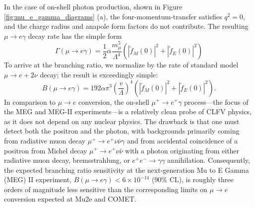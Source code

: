 \documentclass{book}[letterpaper,12pt]
\begin{document}
In the case of on-shell photon production, shown in Figure \ref{fig:mu_e_gamma_diagrams} (a), the four-momentum-transfer satisfies $q^2=0$, and the charge radius and anapole form factors do not contribute. The resulting $\mu\rightarrow e\gamma$ decay rate has the simple form
\begin{equation}
\Gamma\left(\mu\rightarrow e\gamma\right)=\frac{1}{2}\alpha\frac{m_{\mu}^5}{\Lambda^4}\left(|\tilde{f}_M(0)|^2+|\tilde{f}_E(0)|^2\right)
\end{equation}
To arrive at the branching ratio, we normalize by the rate of standard model $\mu\rightarrow e+2\nu$ decay; the result is exceedingly simple:
\begin{equation}
B(\mu\rightarrow e\gamma)=192\alpha\pi^3\left(\frac{v}{\Lambda}\right)^4\left(|\tilde{f}_{M}(0)|^2+|\tilde{f}_E(0)|^2\right).
\end{equation}
In comparison to $\mu\rightarrow e$ conversion, the on-shell $\mu^+\rightarrow e^+\gamma$ process---the focus of the MEG and MEG-II experiments---is a relatively clean probe of CLFV physics, as it does not depend on any nuclear physics. The drawback is that one must detect both the positron and the photon, with backgrounds primarily coming from radiative muon decay $\mu^+\rightarrow e^+\nu\bar{\nu}\gamma$ and from accidental coincidence of a positron from Michel decay $\mu^+\rightarrow e^+\nu\bar{\nu}$ with a photon originating from either radiative muon decay, bremsstrahlung, or $e^+e^-\rightarrow \gamma\gamma$ annihilation. Consequently, the expected branching ratio sensitivity at the next-generation Mu to E Gamma (MEG) II experiment, $B(\mu\rightarrow e\gamma)< 6\times 10^{-14}$ (90\% CL), is roughly three orders of magnitude less sensitive than the corresponding limits on $\mu\rightarrow e$ conversion expected at Mu2e and COMET.
\end{document}
